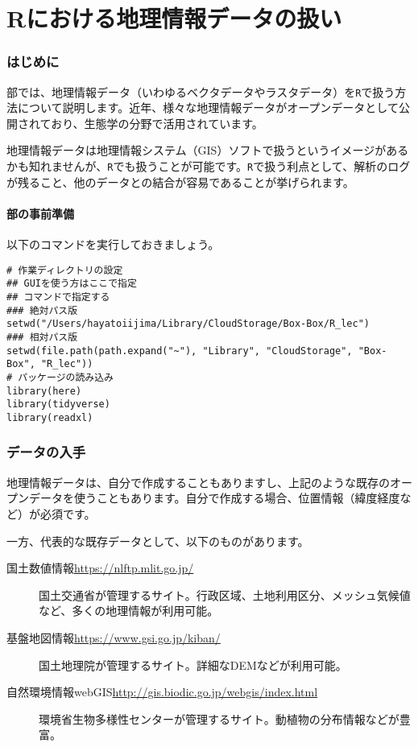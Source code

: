 \part{Rにおける地理情報データの扱い}
\label{gis}
\section{はじめに}
\ref{gis}部では、地理情報データ（いわゆるベクタデータやラスタデータ）を\verb|R|で扱う方法について説明します。近年、様々な地理情報データがオープンデータとして公開されており、生態学の分野で活用されています。

地理情報データは地理情報システム（GIS）ソフトで扱うというイメージがあるかも知れませんが、\verb|R|でも扱うことが可能です。\verb|R|で扱う利点として、解析のログが残ること、他のデータとの結合が容易であることが挙げられます。

  \subsection{\ref{gis}部の事前準備}
以下のコマンドを実行しておきましょう。
\begin{verbatim}
# 作業ディレクトリの設定
## GUIを使う方はここで指定
## コマンドで指定する
### 絶対パス版
setwd("/Users/hayatoiijima/Library/CloudStorage/Box-Box/R_lec")
### 相対パス版
setwd(file.path(path.expand("~"), "Library", "CloudStorage", "Box-Box", "R_lec"))
# パッケージの読み込み
library(here)
library(tidyverse)
library(readxl)
\end{verbatim}

\section{データの入手}
地理情報データは、自分で作成することもありますし、上記のような既存のオープンデータを使うこともあります。自分で作成する場合、位置情報（緯度経度など）が必須です。

一方、代表的な既存データとして、以下のものがあります。

\begin{description}
  \item[国土数値情報\url{https://nlftp.mlit.go.jp/}]国土交通省が管理するサイト。行政区域、土地利用区分、メッシュ気候値など、多くの地理情報が利用可能。
  \item[基盤地図情報\url{https://www.gsi.go.jp/kiban/}]国土地理院が管理するサイト。詳細なDEMなどが利用可能。
  \item[自然環境情報webGIS\url{http://gis.biodic.go.jp/webgis/index.html}]環境省生物多様性センターが管理するサイト。動植物の分布情報などが豊富。
\end{description}

